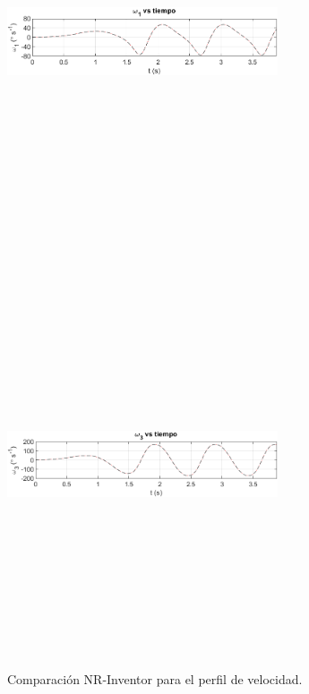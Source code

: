 \documentclass[12pt]{article}
\begin{document}
\begin{multicols}{2}
\begin{figure} [H]
    \end{figure}
    \vspace{-25pt}
        \begin{figure} [H]
        \centerline{\includegraphics[width=8cm, height=12cm,keepaspectratio]{Inventor vs NR/w1 vs inventor.png}}
    \end{figure}
        \vspace{-25pt}
        \begin{figure} [H]
        \centerline{\includegraphics[width=8cm, height=12cm,keepaspectratio]{Inventor vs NR/w3 vs inventor.png}}
        \caption{Comparación NR-Inventor para el perfil de velocidad.}
        \label{}
    \end{figure}
\end{multicols}
\end{document}
